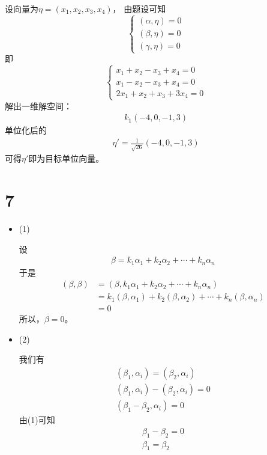 \documentclass{article}
\begin{document}
设向量为$\eta =
  (x_1, x_2, x_3, x_4)
$，
由题设可知
\begin{equation*}
  \begin{cases*}
    (\alpha, \eta) = 0 \\
    (\beta, \eta) = 0  \\
    (\gamma, \eta) = 0
  \end{cases*}
\end{equation*}
即
\begin{equation*}
  \begin{cases*}
    x_1 + x_2 - x_3 + x_4 = 0 \\
    x_1 - x_2 - x_3 + x_4 = 0 \\
    2x_1 + x_2 + x_3 + 3 x_4 = 0
  \end{cases*}
\end{equation*}
解出一维解空间：
\begin{align*}
  k_1 (-4, 0, -1, 3)
\end{align*}
单位化后的
\begin{align*}
  \eta' = \frac{1}{\sqrt{26}} (-4, 0, -1, 3)
\end{align*}
可得$\eta'$即为目标单位向量。

\section*{7}

\begin{itemize}
  \item (1)

        设
        \begin{align*}
          \beta = k_1 \alpha_1 + k_2 \alpha_2 + \cdots + k_n \alpha_n
        \end{align*}
        于是
        \begin{align*}
          (\beta, \beta)
           & = (\beta, k_1 \alpha_1 + k_2 \alpha_2 + \cdots + k_n \alpha_n)                \\
           & = k_1(\beta, \alpha_1) + k_2(\beta, \alpha_2) + \cdots + k_n(\beta, \alpha_n) \\
           & = 0
        \end{align*}
        所以，$\beta = 0$。

  \item (2)

        我们有
        \begin{align*}
          (\beta_1, \alpha_i) = (\beta_2, \alpha_i)     \\
          (\beta_1, \alpha_i) - (\beta_2, \alpha_i) = 0 \\
          (\beta_1 - \beta_2, \alpha_i) = 0
        \end{align*}
        由(1)可知
        \begin{align*}
          \beta_1 - \beta_2 = 0 \\
          \beta_1 = \beta_2
        \end{align*}
\end{itemize}
\end{document}
